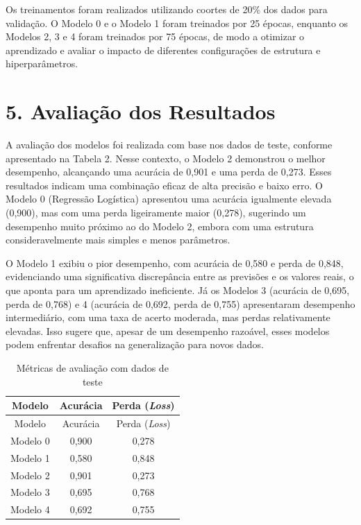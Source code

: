 \documentclass[
  onecolumn]{article}
\begin{document}
Os treinamentos foram realizados utilizando coortes de 20\% dos dados
para validação. O Modelo 0 e o Modelo 1 foram treinados por 25 épocas,
enquanto os Modelos 2, 3 e 4 foram treinados por 75 épocas, de modo a
otimizar o aprendizado e avaliar o impacto de diferentes configurações
de estrutura e hiperparâmetros.

\section{5. Avaliação dos
Resultados}\label{avaliauxe7uxe3o-dos-resultados}

A avaliação dos modelos foi realizada com base nos dados de teste,
conforme apresentado na Tabela 2. Nesse contexto, o Modelo 2 demonstrou
o melhor desempenho, alcançando uma acurácia de 0,901 e uma perda de
0,273. Esses resultados indicam uma combinação eficaz de alta precisão e
baixo erro. O Modelo 0 (Regressão Logística) apresentou uma acurácia
igualmente elevada (0,900), mas com uma perda ligeiramente maior
(0,278), sugerindo um desempenho muito próximo ao do Modelo 2, embora
com uma estrutura consideravelmente mais simples e menos parâmetros.

O Modelo 1 exibiu o pior desempenho, com acurácia de 0,580 e perda de
0,848, evidenciando uma significativa discrepância entre as previsões e
os valores reais, o que aponta para um aprendizado ineficiente. Já os
Modelos 3 (acurácia de 0,695, perda de 0,768) e 4 (acurácia de 0,692,
perda de 0,755) apresentaram desempenho intermediário, com uma taxa de
acerto moderada, mas perdas relativamente elevadas. Isso sugere que,
apesar de um desempenho razoável, esses modelos podem enfrentar desafios
na generalização para novos dados.

\begin{longtable}[]{@{}ccc@{}}
\caption{Métricas de avaliação com dados de teste}\tabularnewline
\toprule\noalign{}
Modelo & Acurácia & Perda (\emph{Loss}) \\
\midrule\noalign{}
\endfirsthead
\toprule\noalign{}
Modelo & Acurácia & Perda (\emph{Loss}) \\
\midrule\noalign{}
\endhead
\bottomrule\noalign{}
\endlastfoot
Modelo 0 & 0,900 & 0,278 \\
Modelo 1 & 0,580 & 0,848 \\
Modelo 2 & 0,901 & 0,273 \\
Modelo 3 & 0,695 & 0,768 \\
Modelo 4 & 0,692 & 0,755 \\
\end{longtable}
\end{document}
